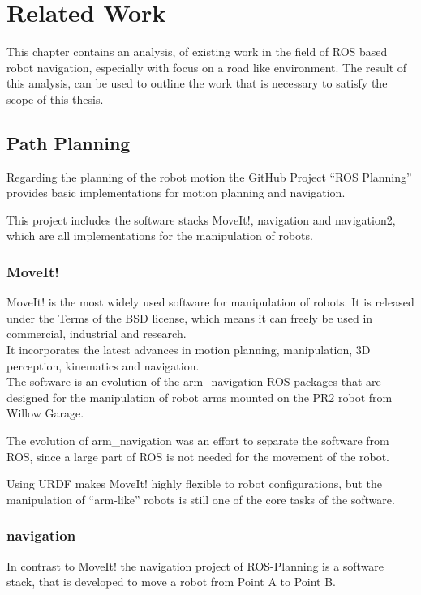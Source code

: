 \chapter{Related Work}
\label{relatedwork}

This chapter contains an analysis, of existing work in the field of ROS based robot navigation, especially with focus on a road like environment. The result of this analysis, can be used to outline the work that is necessary to satisfy the scope of this thesis.
\section{Path Planning}
Regarding the planning of the robot motion the GitHub Project ``ROS Planning'' provides basic implementations for motion planning and navigation\cite{rosplanning}.

This project includes the software stacks MoveIt!, navigation and navigation2, which are all implementations for the manipulation of robots.\\
\subsection{MoveIt!}
MoveIt! is the most widely used software for manipulation of robots. It is released under the Terms of the BSD license, which means it can freely be used in commercial, industrial and research\cite{moveit}.\\
It incorporates the latest advances in motion planning, manipulation, 3D perception, kinematics and navigation.\\

The software is an evolution of the arm\_navigation ROS packages that are designed for the manipulation of robot arms mounted on the PR2 robot from Willow Garage\cite{chitta2012moveit}\cite{willow}.

The evolution of arm\_navigation was an effort to separate the software from ROS, since a large part of ROS is not needed for the movement of the robot. 

Using URDF makes MoveIt! highly flexible to robot configurations, but the manipulation of ``arm-like'' robots is still one of the core tasks of the software.

\subsection{navigation}
In contrast to MoveIt! the navigation project of ROS-Planning is a software stack, that is developed to move a robot from Point A to Point B.

